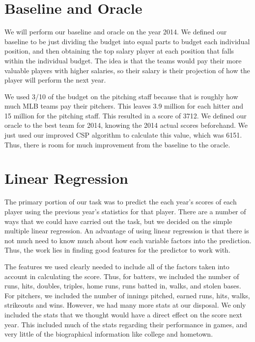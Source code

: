 \documentclass[12pt]{amsart}
\begin{document}
\section{\large Baseline and Oracle}
We will perform our baseline and oracle on the year 2014. We defined our baseline to be just dividing the budget into equal parts to budget each individual position, and then obtaining the top salary player at each position that falls within the individual budget. The idea is that the teams would pay their more valuable players with higher salaries, so their salary is their projection of how the player will perform the next year.
\vspace{.4cm}

We used 3/10 of the budget on the pitching staff because that is roughly how much MLB teams pay their pitchers. This leaves 3.9 million for each hitter and 15 million for the pitching staff. This resulted in a score of 3712. We defined our oracle to the best team for 2014, knowing the 2014 actual scores beforehand. We just used our improved CSP algorithm to calculate this value, which was 6151. Thus, there is room for much improvement from the baseline to the oracle.

\section{\large Linear Regression}
The primary portion of our task was to predict the each year's scores of each player using the previous year's statistics for that player. There are a number of ways that we could have carried out the task, but we decided on the simple multiple linear regression. An advantage of using linear regression is that there is not much need to know much about how each variable factors into the prediction. Thus, the work lies in finding good features for the predictor to work with.
\vspace{.4cm}

The features we used clearly needed to include all of the factors taken into account in calculating the score. Thus, for batters, we included the number of runs, hits, doubles, triples, home runs, runs batted in, walks, and stolen bases. For pitchers, we included the number of innings pitched, earned runs, hits, walks, strikeouts and wins. However, we had many more stats at our disposal. We only included the stats that we thought would have a direct effect on the score next year. This included much of the stats regarding their performance in games, and very little of the biographical information like college and hometown. 
\vspace{.4cm}
\end{document}
